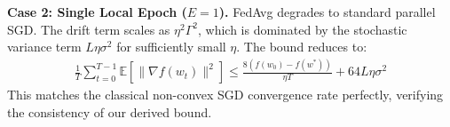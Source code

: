 \documentclass{article}
\begin{document}
\textbf{Case 2: Single Local Epoch ($E = 1$).} FedAvg degrades to standard parallel SGD. The drift term scales as $\eta^2 \Gamma^2$, which is dominated by the stochastic variance term $L \eta \sigma^2$ for sufficiently small $\eta$. The bound reduces to:
\begin{align*}
\frac{1}{T} \sum_{t=0}^{T-1} \mathbb{E}[\|\nabla f(w_t)\|^2] \leq \frac{8(f(w_0) - f(w^*))}{\eta T} + 64 L \eta \sigma^2
\end{align*}
This matches the classical non-convex SGD convergence rate perfectly, verifying the consistency of our derived bound.
\end{document}
